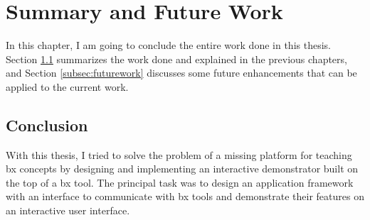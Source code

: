 \section{Summary and Future Work}\label{sec:summary}
In this chapter, I am going to conclude the entire work done in this thesis. Section \ref{subsec:conclusion} summarizes the work done and explained in the previous chapters, and  Section \ref{subsec:futurework} discusses some future enhancements that can be applied to the current work.

\subsection{Conclusion}\label{subsec:conclusion}
With this thesis, I tried to solve the problem of a missing platform for teaching bx concepts by designing and implementing an interactive demonstrator built on the top of a bx tool. The principal task was to design an application framework with an interface to communicate with bx tools and demonstrate their features on an interactive user interface.

